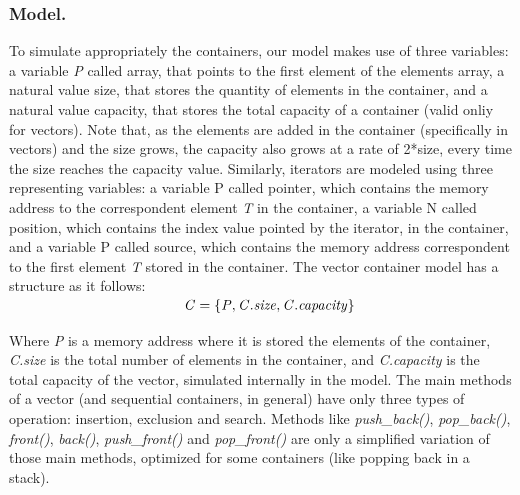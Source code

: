 \documentclass[a4paper]{llncs}
\begin{document}
\subsubsection{Model.}
	To simulate appropriately the containers, our model makes use of three variables: a variable \textit{P} called array, that points to the first element of the elements array, a natural value size, that stores the quantity of elements in the container, and a natural value capacity, that stores the total capacity of a container (valid onliy for vectors). Note that, as the elements are added in the container (specifically in vectors) and the size grows, the capacity also grows at a rate of 2*size, every time the size reaches the capacity value.
	Similarly, iterators are modeled using three representing variables: a variable P called pointer, which contains the memory address to the correspondent element \textit{T} in the container, a variable N called position, which contains the index value pointed by the iterator, in the container, and a variable P called source, which contains the memory address correspondent to the first element \textit{T} stored in the container.
	The vector container model has a structure as it follows:
	
	\[\begin{array}{r@{\:\:}c@{\:\:}l}\label{container-model}
\\[-5ex]
\ &  &\: \mathit{C} = \{ \mathit{P}, \mathit{C.size}, \mathit{C.capacity}\} \:
               
\end{array}
\]
	
	Where \textit{P} is a memory address where it is stored the elements of the container, \textit{C.size} is the total number of elements in the container, and \textit{C.capacity} is the total capacity of the vector, simulated internally in the model.
	The main methods of a vector (and sequential containers, in general) have only three types of operation: insertion, exclusion and search. Methods like \textit{push\_back()}, \textit{pop\_back()}, \textit{front()}, \textit{back()}, \textit{push\_front()} and \textit{pop\_front()} are only a simplified variation of those main methods, optimized for some containers (like popping back in a stack).
\end{document}
